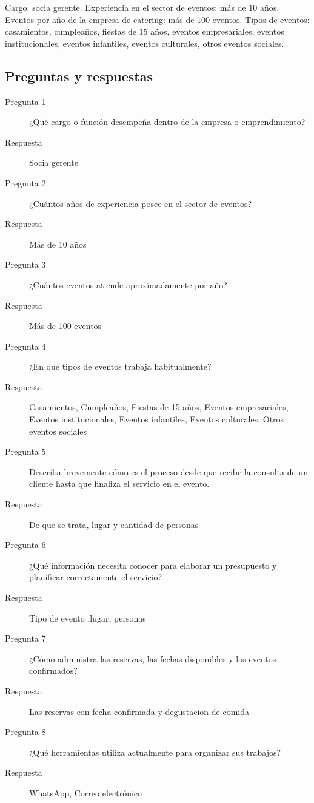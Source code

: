 Cargo: socia gerente. Experiencia en el sector de eventos: más de 10 años. Eventos por año de la empresa de catering: más de 100 eventos. Tipos de eventos: casamientos, cumpleaños, fiestas de 15 años, eventos empresariales, eventos institucionales, eventos infantiles, eventos culturales, otros eventos sociales.

\subsection{Preguntas y respuestas}

\begin{description}
    \item[Pregunta 1] ¿Qué cargo o función desempeña dentro de la empresa o emprendimiento?
    \item[Respuesta] Socia gerente
    \item[Pregunta 2] ¿Cuántos años de experiencia posee en el sector de eventos?
    \item[Respuesta] Más de 10 años
    \item[Pregunta 3] ¿Cuántos eventos atiende aproximadamente por año?
    \item[Respuesta] Más de 100 eventos
    \item[Pregunta 4] ¿En qué tipos de eventos trabaja habitualmente?
    \item[Respuesta] Casamientos, Cumpleaños, Fiestas de 15 años, Eventos empresariales, Eventos institucionales, Eventos infantiles, Eventos culturales, Otros eventos sociales
    \item[Pregunta 5] Describa brevemente cómo es el proceso desde que recibe la consulta de un cliente hasta que finaliza el servicio en el evento.
    \item[Respuesta] De que se trata, lugar y cantidad de personas
    \item[Pregunta 6] ¿Qué información necesita conocer para elaborar un presupuesto y planificar correctamente el servicio?
    \item[Respuesta] Tipo de evento ,lugar, personas
    \item[Pregunta 7] ¿Cómo administra las reservas, las fechas disponibles y los eventos confirmados?
    \item[Respuesta] Las reservas con fecha confirmada y degustacion de comida
    \item[Pregunta 8] ¿Qué herramientas utiliza actualmente para organizar sus trabajos?
    \item[Respuesta] WhatsApp, Correo electrónico

\end{description}
